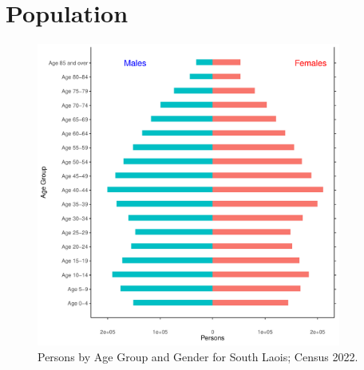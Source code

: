 \documentclass{article}
\begin{document}
\pagebreak

\section{Population} 
\label{sect:Pop}

\begin{figure}[h]
	\centering
	\includegraphics[width = 100mm]{../figures/PyramidPlot.pdf}
	\caption{Persons by Age Group and Gender for South Laois; Census 2022.}
	\label{fig:2ae19629-1a6a-13a3-e055-000000000001}
	\end{figure}
\end{document}
